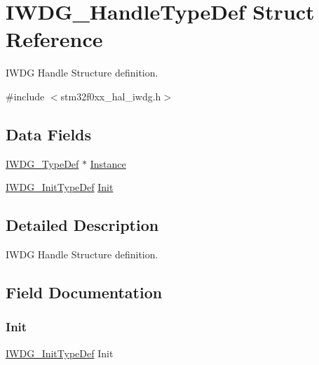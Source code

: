 \hypertarget{struct_i_w_d_g___handle_type_def}{}\section{I\+W\+D\+G\+\_\+\+Handle\+Type\+Def Struct Reference}
\label{struct_i_w_d_g___handle_type_def}


I\+W\+DG Handle Structure definition.  




{\ttfamily \#include $<$stm32f0xx\+\_\+hal\+\_\+iwdg.\+h$>$}

\subsection*{Data Fields}
\begin{DoxyCompactItemize}
\item 
\hyperlink{struct_i_w_d_g___type_def}{I\+W\+D\+G\+\_\+\+Type\+Def} $\ast$ \hyperlink{struct_i_w_d_g___handle_type_def_a94413f7ca8c547a5182ec3b56c2935d2}{Instance}
\item 
\hyperlink{struct_i_w_d_g___init_type_def}{I\+W\+D\+G\+\_\+\+Init\+Type\+Def} \hyperlink{struct_i_w_d_g___handle_type_def_ae9d38c6cdd89c9f89262f567bbae0f67}{Init}
\end{DoxyCompactItemize}


\subsection{Detailed Description}
I\+W\+DG Handle Structure definition. 

\subsection{Field Documentation}
\mbox{\label{struct_i_w_d_g___handle_type_def_ae9d38c6cdd89c9f89262f567bbae0f67}} 
\subsubsection{\texorpdfstring{Init}{Init}}
{\footnotesize\ttfamily \hyperlink{struct_i_w_d_g___init_type_def}{I\+W\+D\+G\+\_\+\+Init\+Type\+Def} Init}

